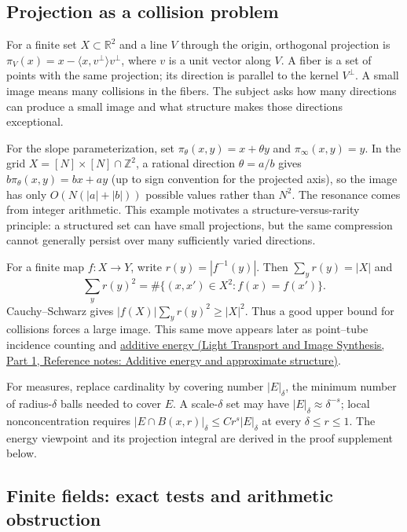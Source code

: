 \subsection{Projection as a collision problem}\label{04-visual-computing-ii-ch032-projection-as-a-collision-problem}

\hypertarget{04-visual-computing-ii-ch032-projection-as-a-collision-problem}{}

For a finite set \(X\subset\mathbb R^2\) and a line \(V\) through the origin, orthogonal projection is \(\pi_V(x)=x-\langle x,v^\perp\rangle v^\perp\), where \(v\) is a unit vector along \(V\). A fiber is a set of points with the same projection; its direction is parallel to the kernel \(V^\perp\). A small image means many collisions in the fibers. The subject asks how many directions can produce a small image and what structure makes those directions exceptional.

For the slope parameterization, set \(\pi_\theta(x,y)=x+\theta y\) and \(\pi_\infty(x,y)=y\). In the grid \(X=[N]\times[N]\cap\mathbb Z^2\), a rational direction \(\theta=a/b\) gives \(b\pi_\theta(x,y)=bx+ay\) (up to sign convention for the projected axis), so the image has only \(O(N(|a|+|b|))\) possible values rather than \(N^2\). The resonance comes from integer arithmetic. This example motivates a structure-versus-rarity principle: a structured set can have small projections, but the same compression cannot generally persist over many sufficiently varied directions.

For a finite map \(f:X\to Y\), write \(r(y)=|f^{-1}(y)|\). Then \(\sum_y r(y)=|X|\) and \[\sum_y r(y)^2=\#\{(x,x')\in X^2:f(x)=f(x')\}.\] Cauchy--Schwarz gives \(|f(X)|\sum_y r(y)^2\ge |X|^2\). Thus a good upper bound for collisions forces a large image. This same move appears later as point--tube incidence counting and \href{../04-Light-Transport-and-Image-Synthesis-P01/main.pdf\#nameddest=appendix-b0732b22e7d6}{additive energy (Light Transport and Image Synthesis, Part 1, Reference notes: Additive energy and approximate structure)}.

For measures, replace cardinality by covering number \(|E|_\delta\), the minimum number of radius-\(\delta\) balls needed to cover \(E\). A scale-\(\delta\) set may have \(|E|_\delta\approx\delta^{-s}\); local nonconcentration requires \(|E\cap B(x,r)|_\delta\le Cr^s|E|_\delta\) at every \(\delta\le r\le1\). The energy viewpoint and its projection integral are derived in the proof supplement below.

\subsection{Finite fields: exact tests and arithmetic obstruction}\label{04-visual-computing-ii-ch032-finite-fields-exact-tests-and-arithmetic-obstruction}

